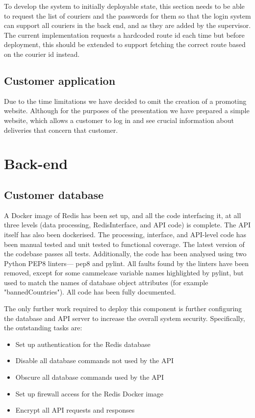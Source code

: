 To develop the system to initially deployable state, this section needs to be able to request the list of couriers and the passwords for them so that the login system can support all couriers in the back end, and as they are added by the supervisor. The current implementation requests a hardcoded route id each time but before deployment, this should be extended to support fetching the correct route based on the courier id instead.

\subsection{Customer application}
Due to the time limitations we have decided to omit the creation of a promoting website. Although for the purposes of the presentation we have prepared a simple website, which allows a customer to log in and see crucial information about deliveries that concern that customer.

\section{Back-end}
\subsection{Customer database}
A Docker image of Redis has been set up, and all the code interfacing it, at all three levels (data processing, RedisInterface, and API code) is complete. The API itself has also been dockerised. The processing, interface, and API-level code has been manual tested and unit tested to functional coverage. The latest version of the codebase passes all tests. Additionally, the code has been analysed using two Python PEP8 linters--- pep8 and pylint. All faults found by the linters have been removed, except for some cammelcase variable names highlighted by pylint, but used to match the names of database object attributes (for example "bannedCountries"). All code has been fully documented.

The only further work required to deploy this component is further configuring the database and API server to increase the overall system security. Specifically, the outstanding tasks are:

\begin{itemize}
    \item Set up authentication for the Redis database
    \item Disable all database commands not used by the API
    \item Obscure all database commands used by the API
    \item Set up firewall access for the Redis Docker image
    \item Encrypt all API requests and responses
\end{itemize}

